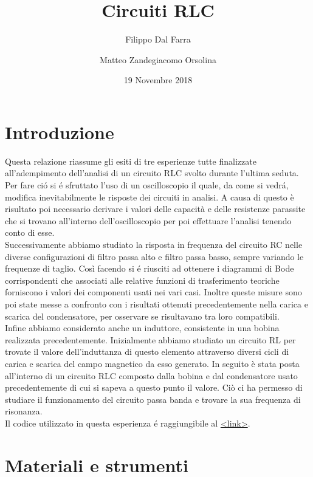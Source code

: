 \documentclass{article}
\title{Circuiti RLC}
\author{Filippo Dal Farra \and Matteo Zandegiacomo Orsolina}
\date{19 Novembre 2018}
\begin{document}
\maketitle

\newpage

\section{Introduzione}

Questa relazione riassume gli esiti di tre esperienze tutte finalizzate all'adempimento dell'analisi di un circuito RLC svolto durante l'ultima seduta. Per fare ci\'o si \'e sfruttato l'uso di un oscilloscopio il quale, da come si vedr\'a, modifica inevitabilmente le risposte dei circuiti in analisi. A causa di questo è risultato poi necessario derivare i valori delle capacità e delle resistenze parassite che si trovano all'interno dell'oscilloscopio per poi effettuare l'analisi tenendo conto di esse. \\

Successivamente abbiamo studiato la risposta in frequenza del circuito RC nelle diverse configurazioni di filtro passa alto e filtro passa basso, sempre variando le frequenze di taglio. Così facendo si \'e riusciti ad ottenere i diagrammi di Bode corrispondenti che associati alle relative funzioni di trasferimento teoriche forniscono i valori dei componenti usati nei vari casi. Inoltre queste misure sono poi state messe a confronto con i risultati ottenuti precedentemente nella carica e scarica del condensatore, per osservare se risultavano tra loro compatibili. \\

Infine abbiamo considerato anche un induttore, consistente in una bobina realizzata precedentemente. Inizialmente abbiamo studiato un circuito RL per trovate il valore dell'induttanza di questo elemento attraverso diversi cicli di carica e scarica del campo magnetico da esso generato. In seguito è stata posta all'interno di un circuito RLC composto dalla bobina e dal condensatore usato precedentemente di cui si sapeva a questo punto il valore. Ciò ci ha permesso di studiare il funzionamento del circuito passa banda e trovare la sua frequenza di risonanza. \\

Il codice utilizzato in questa esperienza \'e raggiungibile al \href{https://gitlab.com/volpx/lab-2/tree/master/Exp234}{<link>}.

\newpage

\section{Materiali e strumenti}
\end{document}

